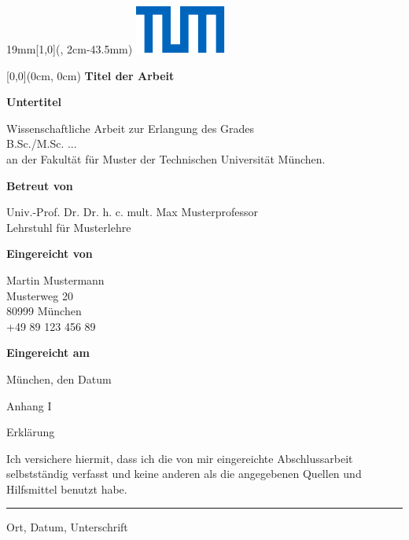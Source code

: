 \documentclass[11pt]{article} %
\newcommand{\Titel}{%
    Titel der Arbeit}
\newcommand{\Untertitel}{%
    Untertitel}
\newcommand{\Grad}{%
    B.Sc./M.Sc. ...}
\newcommand{\Fakultaet}{%
    Fakultät für Muster}
\newcommand{\BetreutVonPerson}{%
    Univ.-Prof. Dr. Dr. h. c. mult. Max Musterprofessor}
\newcommand{\BetreutVonLehrstuhl}{%
    Lehrstuhl für Musterlehre}
\newcommand{\EingereichtVon}{%
    Martin Mustermann\\
    Musterweg 20\\
    80999 München\\
    +49 89 123 456 89}
\newcommand{\ErklaerungUeberschrift}{%
    Anhang I}
\newcommand{\Ort}{%
    Ort}
\newcommand{\Datum}{%
    Datum}
\newcommand{\SeitenrandOben}{43.5mm}
\newcommand{\UniversitaetLogoBreite}{19mm}
\begin{document}
\begin{textblock*}{\UniversitaetLogoBreite}[1,0](\textwidth-1mm, 2cm-\SeitenrandOben)%
    \raggedleft\includegraphics{./Universitaet_Logo_RGB.pdf}%
\end{textblock*}


\begin{textblock*}{\textwidth}[0,0](0cm, 0cm)%
{\fontsize{24pt}{26pt}\selectfont\textbf{\Titel}}

\vspace*{14pt}
{\fontsize{18pt}{27pt}\selectfont\textbf{\Untertitel}}
\end{textblock*}

\vspace*{92.2mm}
\fontsize{15pt}{17.5pt}\selectfont%
Wissenschaftliche Arbeit zur Erlangung des Grades\\
\Grad\\
an der \Fakultaet{} der Technischen Universität München.

\renewcommand{\baselinestretch}{1.47}
\normalsize\selectfont
\vspace*{17.1mm}
\textbf{Betreut von}\tab
\begin{minipage}[t]{\textwidth-\CurrentLineWidth}
\BetreutVonPerson\\
\BetreutVonLehrstuhl\strut
\end{minipage}

\vspace*{4.3mm}
\textbf{Eingereicht von}\tab
\begin{minipage}[t]{\textwidth-\CurrentLineWidth}
\EingereichtVon
\end{minipage}

\vspace*{-1mm}
\textbf{Eingereicht am}\tab 
\begin{minipage}[t]{\textwidth-\CurrentLineWidth}
München, den \Datum\strut
\end{minipage}

\newpage

\vspace*{-15.8mm}
\fontsize{19pt}{21pt}\selectfont
\ErklaerungUeberschrift

\vspace{25.3mm}
Erklärung

\normalsize\selectfont
\vspace{13.2mm}
Ich versichere hiermit, dass ich die von mir eingereichte Abschlussarbeit selbstständig verfasst und keine anderen als die angegebenen Quellen und Hilfsmittel benutzt habe.

\vspace{18.1mm}
\rule[-3.7mm]{\linewidth}{0.5pt}
\Ort{}, \Datum{}, Unterschrift
\end{document}

